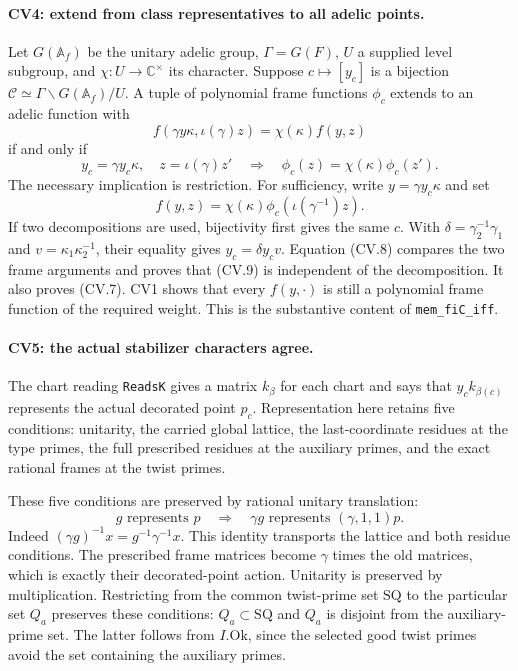\paragraph{CV4: extend from class representatives to all adelic points.}
Let \(G(\mathbb A_f)\) be the unitary adelic group,
\(\Gamma=G(F)\), \(U\) a supplied level subgroup, and
\(\chi:U\to\mathbb C^\times\) its character. Suppose
\(c\mapsto[y_c]\) is a bijection
\(\mathcal C\simeq\Gamma\backslash G(\mathbb A_f)/U\).
A tuple of polynomial frame functions \(\phi_c\) extends
to an adelic function with
\[
 f(\gamma y\kappa,\iota(\gamma)z)=\chi(\kappa)f(y,z)
                                                               \tag{CV.7}
\]
if and only if
\[
 y_c=\gamma y_c\kappa,\quad z=\iota(\gamma)z'
       \quad\Longrightarrow\quad
             \phi_c(z)=\chi(\kappa)\phi_c(z').                  \tag{CV.8}
\]
The necessary implication is restriction. For sufficiency,
write \(y=\gamma y_c\kappa\) and set
\[
             f(y,z)=\chi(\kappa)
                          \phi_c(\iota(\gamma^{-1})z).         \tag{CV.9}
\]
If two decompositions are used, bijectivity first gives the
same \(c\). With
\(\delta=\gamma_2^{-1}\gamma_1\) and
\(v=\kappa_1\kappa_2^{-1}\), their equality gives
\(y_c=\delta y_cv\). Equation (CV.8) compares the two
frame arguments and proves that (CV.9) is independent of
the decomposition. It also proves (CV.7).
CV1 shows that every \(f(y,\cdot)\) is still a polynomial
frame function of the required weight. This is the
substantive content of \texttt{mem\_fiC\_iff}.

\paragraph{CV5: the actual stabilizer characters agree.}
The chart reading \texttt{ReadsK} gives a matrix \(k_\beta\)
for each chart and says that \(y_ck_{\beta(c)}\) represents
the actual decorated point \(p_c\). Representation here
retains five conditions: unitarity, the carried global
lattice, the last-coordinate residues at the type primes,
the full prescribed residues at the auxiliary primes, and
the exact rational frames at the twist primes.

These five conditions are preserved by rational unitary
translation:
\[
       g\text{ represents }p
       \quad\Longrightarrow\quad
       \gamma g\text{ represents }(\gamma,1,1)p.
                                                               \tag{CV.10}
\]
Indeed
\((\gamma g)^{-1}x=g^{-1}\gamma^{-1}x\).
This identity transports the lattice and both residue
conditions. The prescribed frame matrices become
\(\gamma\) times the old matrices, which is exactly their
decorated-point action. Unitarity is preserved by
multiplication. Restricting from the common twist-prime set
\(\mathrm{SQ}\) to the particular set \(Q_a\) preserves
these conditions: \(Q_a\subset\mathrm{SQ}\) and
\(Q_a\) is disjoint from the auxiliary-prime set. The latter
follows from \(I.\mathrm{Ok}\), since the selected good
twist primes avoid the set containing the auxiliary primes.

